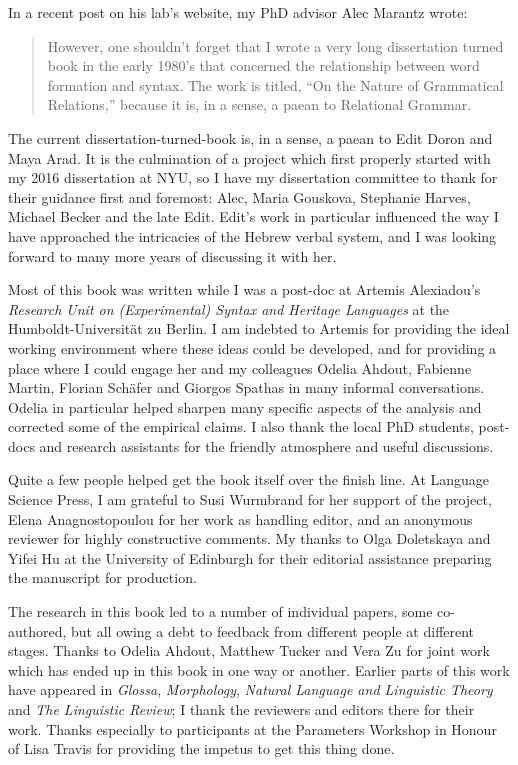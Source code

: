 \addchap{\lsAcknowledgementTitle} 

In a recent post on his lab's website, my PhD advisor Alec Marantz wrote:
\begin{quote}
	However, one shouldn't forget that I wrote a very long dissertation turned book in the early 1980's that concerned the relationship between word formation and syntax. The work is titled, ``On the Nature of Grammatical Relations,'' because it is, in a sense, a paean to Relational Grammar.
\end{quote}
The current dissertation-turned-book is, in a sense, a paean to Edit Doron and Maya Arad. It is the culmination of a project which first properly started with my 2016 dissertation at NYU, so I have my dissertation committee to thank for their guidance first and foremost: Alec, Maria Gouskova, Stephanie Harves, Michael Becker and the late Edit. Edit's work in particular influenced the way I have approached the intricacies of the Hebrew verbal system, and I was looking forward to many more years of discussing it with her.

Most of this book was written while I was a post-doc at Artemis Alexiadou's \emph{Research Unit on (Experimental) Syntax and Heritage Languages} at the Humboldt-Universit\"at zu Berlin. I am indebted to Artemis for providing the ideal working environment where these ideas could be developed, and for providing a place where I could engage her and my colleagues Odelia Ahdout, Fabienne Martin, Florian Sch\"afer and Giorgos Spathas in many informal conversations. Odelia in particular helped sharpen many specific aspects of the analysis and corrected some of the empirical claims. I also thank the local PhD students, post-docs and research assistants for the friendly atmosphere and useful discussions.

Quite a few people helped get the book itself over the finish line. At Language Science Press, I am grateful to Susi Wurmbrand for her support of the project, Elena Anagnostopoulou for her work as handling editor, and an anonymous reviewer for highly constructive comments. My thanks to Olga Doletskaya and Yifei Hu at the University of Edinburgh for their editorial assistance preparing the manuscript for production.

The research in this book led to a number of individual papers, some co-authored, but all owing a debt to feedback from different people at different stages. Thanks to Odelia Ahdout, Matthew Tucker and Vera Zu for joint work which has ended up in this book in one way or another. Earlier parts of this work have appeared in \emph{Glossa}, \emph{Morphology}, \emph{Natural Language and Linguistic Theory} and \emph{The Linguistic Review}; I thank the reviewers and editors there for their work. Thanks especially to participants at the Parameters Workshop in Honour of Lisa Travis for providing the impetus to get this thing done.

